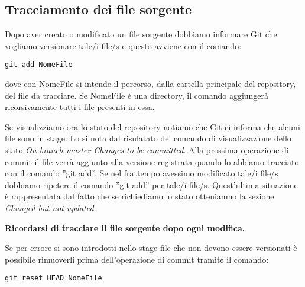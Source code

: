 \subsection{Tracciamento dei file sorgente}
Dopo aver creato o modificato un file sorgente dobbiamo informare Git che vogliamo versionare tale/i file/s e questo avviene con il comando:

\begin{center}
\texttt{git add NomeFile}
\end{center}

dove con NomeFile si intende il percorso, dalla cartella principale del repository, del file da tracciare. Se NomeFile è una directory, il comando aggiungerà ricorsivamente tutti i file presenti in essa.

Se visualizziamo ora lo stato del repository notiamo che Git ci informa che alcuni file sono in stage. Lo si nota dal risulatato del comando di visualizzazione dello stato \textit{On branch master Changes to be committed}. Alla prossima operazione di commit il file verrà aggiunto alla versione registrata quando lo abbiamo tracciato con il comando ''git add''. Se nel frattempo avessimo modificato tale/i file/s dobbiamo ripetere il comando ''git add'' per tale/i file/s. Quest'ultima situazione è rappresentata dal fatto che se richiediamo lo stato ottenianmo la sezione \textit{Changed but not updated}.

\begin{center}
\textbf{Ricordarsi di tracciare il file sorgente dopo ogni modifica.}
\end{center}

Se per errore si sono introdotti nello stage file che non devono essere versionati è possibile rimuoverli prima dell'operazione di commit tramite il comando:

\begin{center}
\texttt{git reset HEAD NomeFile}
\end{center}